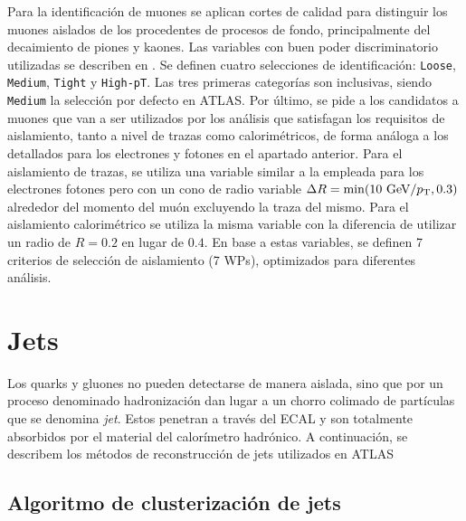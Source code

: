 Para la identificación de muones se aplican cortes de calidad para distinguir los muones aislados de los procedentes de procesos de fondo, principalmente del decaimiento de piones y kaones.
Las variables con buen poder discriminatorio utilizadas se describen en . Se definen cuatro selecciones de identificación: \texttt{Loose}, \texttt{Medium}, \texttt{Tight} y \texttt{High-pT}. Las tres primeras categorías son inclusivas, siendo \texttt{Medium} la selección por defecto en \ac{ATLAS}. Por último, se pide a los candidatos a muones que van a ser utilizados por los análisis que satisfagan los requisitos de aislamiento, tanto a nivel de trazas como calorimétricos, de forma análoga a los detallados para los electrones y fotones en el apartado anterior. Para el aislamiento de trazas, se utiliza una variable similar a la empleada para los electrones fotones pero con un cono de radio variable \(\Delta R = \min(10~\text{GeV}/p_{\text{T}}, 0.3)\) alrededor del momento del muón excluyendo la traza del mismo. Para el aislamiento calorimétrico se utiliza la misma variable \etconefo con la diferencia de utilizar un radio de \(R=0.2\) en lugar de \(0.4\). En base a estas variables, se definen 7 criterios de selección de aislamiento (7 \acp{WP}), optimizados para diferentes análisis.








\section{Jets}
\label{sec:objects:jets}

Los quarks y gluones no pueden detectarse de manera aislada, sino que por un proceso denominado hadronización dan lugar a un chorro colimado de partículas que se denomina \textit{jet}. Estos penetran a través del \ac{ECAL} y son totalmente absorbidos por el material del calorímetro hadrónico. A continuación, se describem los métodos de reconstrucción de jets utilizados en \ac{ATLAS}

\subsection{Algoritmo de clusterización de jets \texorpdfstring{\antikt}{Anti-kT}}

